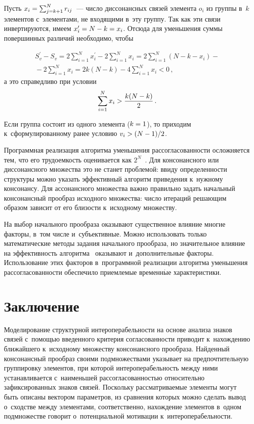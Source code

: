 \begin{multicols}{2}
     Пусть $x_i\hm= \sum\nolimits^N_{j=k+1} r_{ij}$~--- число диссонансных 
связей элемента $o_i$ из группы в~$k$ элементов с~элементами, не входящими 
в~эту группу. Так как эти связи инвертируются, имеем $x_i^\prime\hm= N\hm- k\hm= x_i$.
 Отсюда для уменьшения суммы повершинных различий 
необходимо, чтобы

\noindent
     \begin{multline*}
     S_v^\prime -S_v= 2\sum\limits^N_{i=1} x_i^\prime -2\sum\limits^N_{i=1} 
x_i =2\sum\limits^N_{i=1} \left( N-k-x_i\right) -{}\\
{}- 2\sum\limits^N_{i=1} x_i= 2k(N-k) -4\sum\limits^N_{i=1} x_i<0\,,
     \end{multline*}
а это справедливо при условии
$$
\sum\limits^N_{i=1} x_i > \displaystyle\frac{\displaystyle k(N-k)\mathstrut}{\displaystyle 2\mathstrut}\,.
$$
     
     Если группа состоит из одного элемента ($k\hm=1$), то приходим 
к~сформулированному ранее условию $v_i\hm> (N-1)/2$.
     
     Программная реализация алгоритма уменьшения рас\-со\-гла\-со\-ван\-ности 
ослож\-ня\-ет\-ся тем, что его тру\-до\-ем\-кость оценивается как $2^N$~\cite{4-dul}. 
Для консонансного или диссонансного множества это не станет проб\-ле\-мой: 
ввиду опре\-де\-лен\-ности структуры можно указать эффективный алгоритм 
приведения к~нуж\-но\-му консонансу. Для ассонансного множества важ\-но 
правильно задать начальный консонансный прообраз исходного множества: 
чис\-ло итераций ре\-ша\-ющим образом зависит от его бли\-зости к~исходному 
множеству. 
     
     На выбор начального прообраза оказывают существенное влияние 
многие факторы, в~том чис\-ле и~субъективные. Можно использовать только 
математические методы задания начального прообраза, но значительное 
вли\-яние на эф\-фек\-тив\-ность алгоритма~\cite{4-dul} оказывают 
и~дополнительные факторы. Использование этих факторов в~программной 
реализации алгоритма уменьшения рас\-со\-гла\-со\-ван\-ности обеспечило 
приемлемые временн$\acute{\mbox{ы}}$е характеристики. 

\section{Заключение}

     Моделирование структурной ин\-тер\-опе\-ра\-бель\-ности на основе анализа 
знаков связей с~по\-мощью введенного критерия со\-гла\-со\-ван\-ности приводит 
к~нахождению ближайшего к~исходному множеству консонансного 
прообраза. Найденный консонансный прообраз своими подмножествами 
указывает на предпочтительную группировку элементов, при которой 
ин\-тер\-опе\-ра\-бель\-ность меж\-ду ними уста\-нав\-ли\-ва\-ет\-ся с~наименьшей 
рас\-со\-гла\-со\-ван\-ностью относительно зафиксированных знаков связей. 
Поскольку рас\-смат\-ри\-ва\-емые элементы могут быть описаны вектором 
па\-ра\-мет\-ров, из сравнения которых мож\-но сделать вывод о~сходстве меж\-ду 
элементами, соответственно, на\-хож\-де\-ние элементов в~одном подмножестве 
говорит о~потенциальной мотивации к~ин\-тер\-опе\-ра\-бель\-ности.


\end{multicols}
